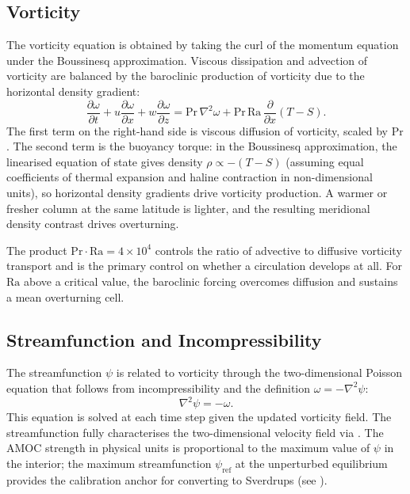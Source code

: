 \documentclass[12pt, a4paper]{article}
\renewcommand{\Pr}{\mathrm{Pr}}
\newcommand{\Ra}{\mathrm{Ra}}
\newcommand{\pd}[2]{\frac{\partial #1}{\partial #2}}
\newcommand{\lap}{\nabla^2}
\begin{document}
\subsection{Vorticity}
\label{sec:vort}

The vorticity equation is obtained by taking the curl of the momentum equation
under the Boussinesq approximation. Viscous dissipation and advection of
vorticity are balanced by the baroclinic production of vorticity due to the
horizontal density gradient:
\begin{equation}
  \pd{\omega}{t} + u\pd{\omega}{x} + w\pd{\omega}{z}
  = \Pr\,\lap\omega + \Pr\,\Ra\,\pd{}{x}(T - S).
  \label{eq:omega}
\end{equation}
The first term on the right-hand side is viscous diffusion of vorticity,
scaled by $\Pr$. The second term is the buoyancy torque: in the Boussinesq
approximation, the linearised equation of state gives density $\rho \propto
-(T - S)$ (assuming equal coefficients of thermal expansion and haline
contraction in non-dimensional units), so horizontal density gradients drive
vorticity production. A warmer or fresher column at the same latitude is
lighter, and the resulting meridional density contrast drives overturning.

The product $\Pr\cdot\Ra = 4\times10^4$ controls the ratio of advective to
diffusive vorticity transport and is the primary control on whether a
circulation develops at all. For $\Ra$ above a critical value, the baroclinic
forcing overcomes diffusion and sustains a mean overturning cell.

\subsection{Streamfunction and Incompressibility}
\label{sec:psi}

The streamfunction $\psi$ is related to vorticity through the two-dimensional
Poisson equation that follows from incompressibility and the definition
$\omega = -\lap\psi$:
\begin{equation}
  \lap\psi = -\omega.
  \label{eq:psi}
\end{equation}
This equation is solved at each time step given the updated vorticity field.
The streamfunction fully characterises the two-dimensional velocity field via
. The AMOC strength in physical units is proportional to the
maximum value of $\psi$ in the interior; the maximum streamfunction $\psi_\mathrm{ref}$
at the unperturbed equilibrium provides the calibration anchor for converting
to Sverdrups (see ).
\end{document}
